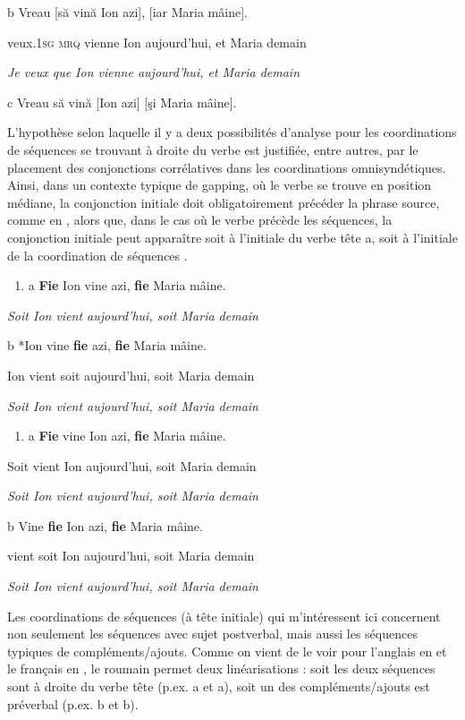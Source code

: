   b  Vreau [să vină Ion azi], [iar Maria mâine].

    veux.\textsc{1sg} \textsc{mrq} vienne Ion aujourd'hui, et Maria demain

{\itshape
Je veux que Ion vienne aujourd'hui, et Maria demain}

  c  Vreau să vină [Ion azi] [şi Maria mâine].

L'hypothèse selon laquelle il y a deux possibilités d'analyse pour les coordinations de séquences se trouvant à droite du verbe est justifiée, entre autres, par le placement des conjonctions corrélatives dans les coordinations omnisyndétiques. Ainsi, dans un contexte typique de gapping, où le verbe se trouve en position médiane, la conjonction initiale doit obligatoirement précéder la phrase source, comme en , alors que, dans le cas où le verbe précède les séquences, la conjonction initiale peut apparaître soit à l'initiale du verbe tête a, soit à l'initiale de la coordination de séquences .


\begin{enumerate}
\item \label{bkm:Ref289938832}a  \textbf{Fie} Ion vine azi, \textbf{fie} Maria mâine.


\end{enumerate}
{\itshape
Soit Ion vient aujourd'hui, soit Maria demain}

  b  *Ion vine \textbf{fie} azi, \textbf{fie} Maria mâine.

    Ion vient soit aujourd'hui, soit Maria demain

{\itshape
Soit Ion vient aujourd'hui, soit Maria demain}


\begin{enumerate}
\item \label{bkm:Ref289938899}a  \textbf{Fie} vine Ion azi, \textbf{fie} Maria mâine.


\end{enumerate}
Soit vient Ion aujourd'hui, soit Maria demain

{\itshape
Soit Ion vient aujourd'hui, soit Maria demain}

  b  Vine \textbf{fie} Ion azi, \textbf{fie} Maria mâine.

    vient soit Ion aujourd'hui, soit Maria demain

{\itshape
Soit Ion vient aujourd'hui, soit Maria demain}

Les coordinations de séquences (à tête initiale) qui m'intéressent ici concernent non seulement les séquences avec sujet postverbal, mais aussi les séquences typiques de compléments/ajouts. Comme on vient de le voir pour l'anglais en  et le français en , le roumain permet deux linéarisations : soit les deux séquences sont à droite du verbe tête (p.ex. a et a), soit un des compléments/ajouts est préverbal (p.ex. b et b).  


